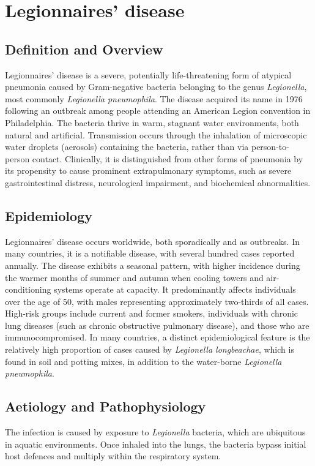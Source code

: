 \chapter{Legionnaires' disease}

\section*{Definition and Overview}
Legionnaires' disease is a severe, potentially life-threatening form of atypical pneumonia caused by Gram-negative bacteria belonging to the genus \textit{Legionella}, most commonly \textit{Legionella pneumophila}. The disease acquired its name in 1976 following an outbreak among people attending an American Legion convention in Philadelphia. The bacteria thrive in warm, stagnant water environments, both natural and artificial. Transmission occurs through the inhalation of microscopic water droplets (aerosols) containing the bacteria, rather than via person-to-person contact. Clinically, it is distinguished from other forms of pneumonia by its propensity to cause prominent extrapulmonary symptoms, such as severe gastrointestinal distress, neurological impairment, and biochemical abnormalities.

\section*{Epidemiology}
Legionnaires' disease occurs worldwide, both sporadically and as outbreaks. In many countries, it is a notifiable disease, with several hundred cases reported annually. The disease exhibits a seasonal pattern, with higher incidence during the warmer months of summer and autumn when cooling towers and air-conditioning systems operate at capacity. It predominantly affects individuals over the age of 50, with males representing approximately two-thirds of all cases. High-risk groups include current and former smokers, individuals with chronic lung diseases (such as chronic obstructive pulmonary disease), and those who are immunocompromised. In many countries, a distinct epidemiological feature is the relatively high proportion of cases caused by \textit{Legionella longbeachae}, which is found in soil and potting mixes, in addition to the water-borne \textit{Legionella pneumophila}.

\section*{Aetiology and Pathophysiology}
The infection is caused by exposure to \textit{Legionella} bacteria, which are ubiquitous in aquatic environments. Once inhaled into the lungs, the bacteria bypass initial host defences and multiply within the respiratory system.

